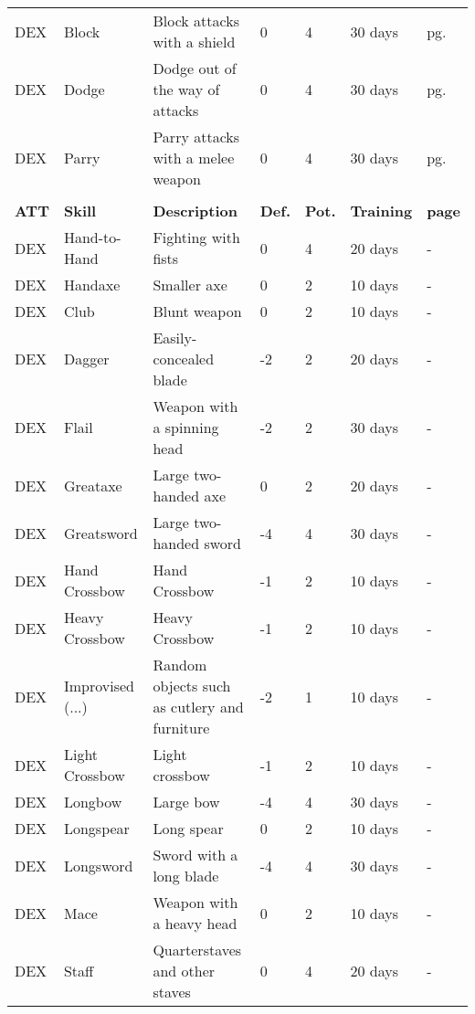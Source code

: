 \begin{center}
\begin{xltabular}{\textwidth}{l l X l l l l}
        DEX & Block & Block attacks with a shield & 0 & 4 & 30 days & pg. \pageref{skill:block} \\
        DEX & Dodge & Dodge out of the way of attacks & 0 & 4 & 30 days & pg. \pageref{skill:dodge} \\
        DEX & Parry & Parry attacks with a melee weapon & 0 & 4 & 30 days & pg. \pageref{skill:parry} \\
         \\*
        \textbf{ATT} & \textbf{Skill} & \textbf{Description} & \textbf{Def.} & \textbf{Pot.} & \textbf{Training} & \textbf{page} \\*
        DEX & Hand-to-Hand & Fighting with fists & 0 & 4 & 20 days & - \\
        DEX & Handaxe & Smaller axe & 0 & 2 & 10 days & - \\
        DEX & Club & Blunt weapon & 0 & 2 & 10 days & - \\
        DEX & Dagger & Easily-concealed blade & -2 & 2 & 20 days & - \\
        DEX & Flail & Weapon with a spinning head & -2 & 2 & 30 days & - \\ %
        DEX & Greataxe & Large two-handed axe & 0 & 2 & 20 days & - \\
        DEX & Greatsword & Large two-handed sword & -4 & 4 & 30 days & - \\ %
        DEX & Hand Crossbow & Hand Crossbow & -1 & 2 & 10 days & - \\
        DEX & Heavy Crossbow & Heavy Crossbow & -1 & 2 & 10 days & - \\
        DEX & Improvised (...) & Random objects such as cutlery and furniture & -2 & 1 & 10 days & - \\
        DEX & Light Crossbow & Light crossbow & -1 & 2 & 10 days & - \\
        DEX & Longbow & Large bow & -4 & 4 & 30 days & - \\ %
        DEX & Longspear & Long spear & 0 & 2 & 10 days & - \\
        DEX & Longsword & Sword with a long blade & -4 & 4 & 30 days & - \\
        DEX & Mace & Weapon with a heavy head & 0 & 2 & 10 days & - \\ %
        DEX & Staff & Quarterstaves and other staves & 0 & 4 & 20 days & - \\

\end{xltabular}
\end{center}

